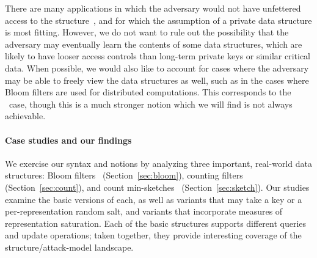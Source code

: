 There are many applications in which the adversary would not have unfettered
access to the structure~\cite{gerbet2015power}, and for which the assumption of
a private data structure is most fitting. However, we do not want to rule out
the possibility that the adversary may eventually learn the contents of some
data structures, which are likely to have looser access controls than long-term
private keys or similar critical data. When possible, we would also like to
account for cases where the adversary may be able to freely view the data
structures as well, such as in the cases where Bloom filters are used for
distributed computations. This corresponds to the \errep\ case, though this is a
much stronger notion which we will find is not always achievable.


\paragraph{Case studies and our findings}
We exercise our syntax and notions by analyzing three important, real-world data
structures: Bloom filters~\cite{bloom1970space} (Section~\ref{sec:bloom}), counting
filters~\cite{fan2000summary} (Section~\ref{sec:count}), and count
min-sketches~\cite{cormode2005improved} (Section~\ref{sec:sketch}). Our studies examine the basic
versions of each, as well as variants that may take a key or a
per-representation random salt, and variants that incorporate measures
of representation saturation.  Each of the basic structures supports different queries and
update operations; taken together, they provide interesting coverage
of the structure/attack-model landscape.

